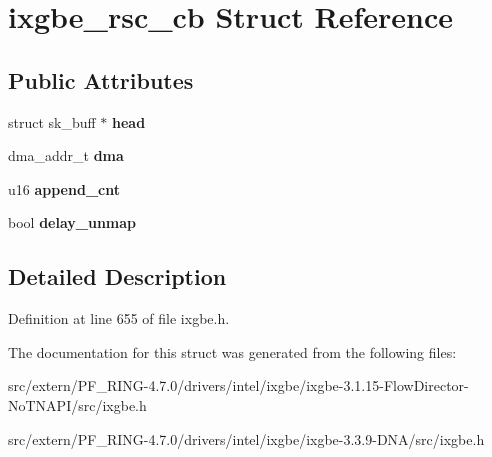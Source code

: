 \hypertarget{structixgbe__rsc__cb}{
\section{ixgbe\_\-rsc\_\-cb Struct Reference}
\label{structixgbe__rsc__cb}
}
\subsection*{Public Attributes}
\begin{DoxyCompactItemize}
\item 
\hypertarget{structixgbe__rsc__cb_aee7d6f4ecc7b7c4067518b2b3bad68ce}{
struct sk\_\-buff $\ast$ {\bfseries head}}
\label{structixgbe__rsc__cb_aee7d6f4ecc7b7c4067518b2b3bad68ce}

\item 
\hypertarget{structixgbe__rsc__cb_a6ef691de3f11b1ae71552d600b853328}{
dma\_\-addr\_\-t {\bfseries dma}}
\label{structixgbe__rsc__cb_a6ef691de3f11b1ae71552d600b853328}

\item 
\hypertarget{structixgbe__rsc__cb_a0bb1de466e10f70dd1a8e8790004cee5}{
u16 {\bfseries append\_\-cnt}}
\label{structixgbe__rsc__cb_a0bb1de466e10f70dd1a8e8790004cee5}

\item 
\hypertarget{structixgbe__rsc__cb_a53f137237920701ad03518735ae4edec}{
bool {\bfseries delay\_\-unmap}}
\label{structixgbe__rsc__cb_a53f137237920701ad03518735ae4edec}

\end{DoxyCompactItemize}


\subsection{Detailed Description}


Definition at line 655 of file ixgbe.h.



The documentation for this struct was generated from the following files:\begin{DoxyCompactItemize}
\item 
src/extern/PF\_\-RING-\/4.7.0/drivers/intel/ixgbe/ixgbe-\/3.1.15-\/FlowDirector-\/NoTNAPI/src/ixgbe.h\item 
src/extern/PF\_\-RING-\/4.7.0/drivers/intel/ixgbe/ixgbe-\/3.3.9-\/DNA/src/ixgbe.h\end{DoxyCompactItemize}
